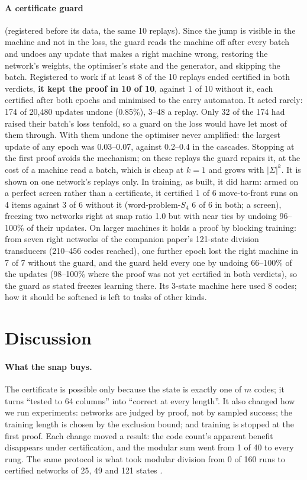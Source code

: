\documentclass[11pt]{article}
\begin{document}
\paragraph{A certificate guard} (registered before its data, the same 10 replays). Since the jump is
visible in the machine and not in the loss, the guard reads the machine off after every batch and
undoes any update that makes a right machine wrong, restoring the network's weights, the
optimiser's state and the generator, and skipping the batch. Registered to work if at least 8 of
the 10 replays ended certified in both verdicts, \textbf{it kept the proof in 10 of 10}, against 1
of 10 without it, each certified after both epochs and minimised to the carry automaton. It acted
rarely: 174 of 20{,}480 updates undone (0.85\%), 3--48 a replay. Only 32 of the 174 had raised their
batch's loss tenfold, so a guard on the loss would have let most of them through. With them undone
the optimiser never amplified: the largest update of any epoch was 0.03--0.07, against 0.2--0.4 in
the cascades. Stopping at the first proof avoids the mechanism; on these replays the guard repairs
it, at the cost of a machine read a batch, which is cheap at $k = 1$ and grows with $|\Sigma|^k$. It
is shown on one network's replays only. In training, as built, it did harm: armed on a perfect screen
rather than a certificate, it certified 1 of 6 move-to-front runs on 4 items against 3 of 6 without it
(word-problem-$S_4$ 6 of 6 in both; a screen), freezing two networks right at snap ratio 1.0 but with
near ties by undoing 96--100\% of their updates. On larger machines it holds a proof by blocking
training: from seven right networks of the companion paper's 121-state division transducers (210--456
codes reached), one further epoch lost the right machine in 7 of 7 without the guard, and the guard
held every one by undoing 66--100\% of the updates (98--100\% where the proof was not yet certified
in both verdicts), so the guard as stated freezes learning there. Its 3-state machine here used 8
codes; how it should be softened is left to tasks of other kinds.

\section{Discussion}

\paragraph{What the snap buys.} The certificate is possible only because the state is exactly one
of $m$ codes; it turns ``tested to 64 columns'' into ``correct at every length''. It also changed how we run experiments: networks are judged by proof, not by
sampled success; the training length is chosen by the exclusion bound; and training is stopped at
the first proof. Each change moved a result: the code count's apparent benefit disappears under
certification, and the modular sum went from 1 of 40 to every rung. The same protocol is what took
modular division from 0 of 160 runs to certified networks of 25, 49 and 121 states
\citep{barkhuizen-2026-certified-modular-division}.
\end{document}
